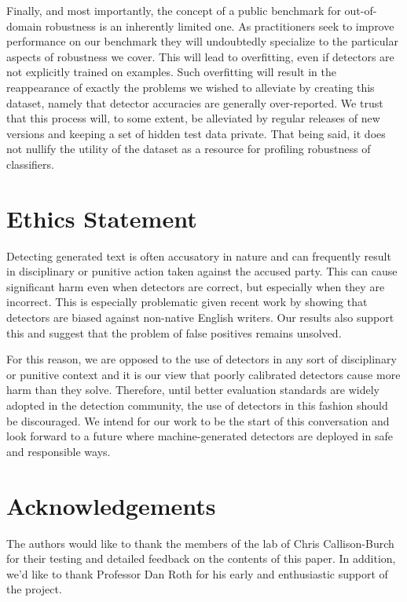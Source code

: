\documentclass[11pt]{article}
\begin{document}
Finally, and most importantly, the concept of a public benchmark for out-of-domain robustness is an inherently limited one. As practitioners seek to improve performance on our benchmark they will undoubtedly specialize to the particular aspects of robustness we cover. This will lead to overfitting, even if detectors are not explicitly trained on examples. Such overfitting will result in the reappearance of exactly the problems we wished to alleviate by creating this dataset, namely that detector accuracies are generally over-reported. We trust that this process will, to some extent, be alleviated by regular releases of new versions and keeping a set of hidden test data private. That being said, it does not nullify the utility of the dataset as a resource for profiling robustness of classifiers.

\section*{Ethics Statement}
Detecting generated text is often accusatory in nature and can frequently result in disciplinary or punitive action taken against the accused party. This can cause significant harm even when detectors are correct, but especially when they are incorrect. This is especially problematic given recent work by \citet{liang2023gpt} showing that detectors are biased against non-native English writers. Our results also support this and suggest that the problem of false positives remains unsolved.

For this reason, we are opposed to the use of detectors in any sort of disciplinary or punitive context and it is our view that poorly calibrated detectors cause more harm than they solve. Therefore, until better evaluation standards are widely adopted in the detection community, the use of detectors in this fashion should be discouraged. We intend for our work to be the start of this conversation and look forward to a future where machine-generated detectors are deployed in safe and responsible ways. 

\section*{Acknowledgements}
The authors would like to thank the members of the lab of Chris Callison-Burch for their testing and detailed feedback on the contents of this paper. In addition, we'd like to thank Professor Dan Roth for his early and enthusiastic support of the project.
\end{document}
